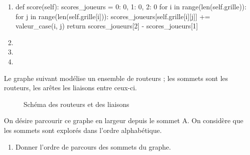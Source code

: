 \begin{enumerate}
        \medskip
    \item \quad
    
     \begin{CodePythontexAlt}[TaillePolice=\large, Largeur=1\linewidth,Centre,Lignes=true,PremLigne=1]{}
    def score(self):
        scores_joueurs = {0: 0, 1: 0, 2: 0}
        for i in range(len(self.grille)):
            for j in range(len(self.grille[i])):
                scores_joueurs[self.grille[i][j]] += valeur_case(i, j)
        return scores_joueurs[2] - scores_joueurs[1]
    \end{CodePythontexAlt}
    
        \medskip
    \item \quad
    
        \medskip
    \item \quad
    
        \medskip
    \item \quad
\end{enumerate}


    Le graphe suivant modélise un ensemble de routeurs ; les sommets sont les routeurs, les arêtes les liaisons entre ceux-ci.

\begin{figure}[!h]
\begin{center}
\end{center}
\caption{Schéma des routeurs et des liaisons}\label{reseau_exo1}
\end{figure}

On désire parcourir ce graphe en largeur depuis le sommet A. On considère que les sommets sont explorés dans l'ordre alphabétique.


\begin{enumerate}[series=monDS]
    \item Donner l'ordre de parcours des sommets du graphe.\hfill 

\end{enumerate}

